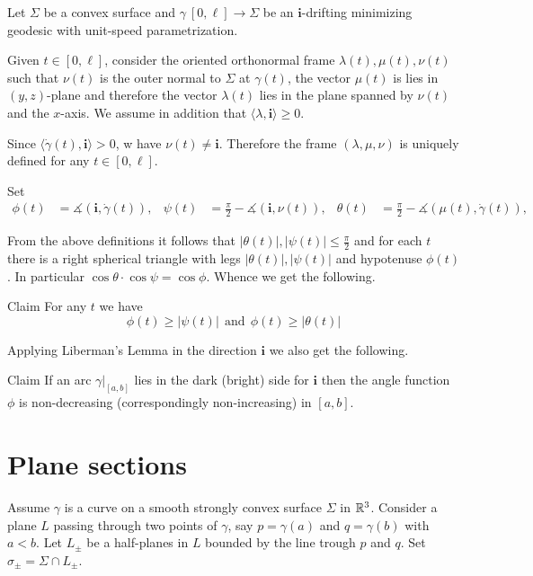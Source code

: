 \documentclass[a4paper,10pt]{article}
\begin{document}
Let $\Sigma$ be a convex surface 
and $\gamma\:[0,\ell]\to \Sigma$ be an $\bm{i}$-drifting minimizing geodesic 
with unit-speed para\-me\-tri\-za\-tion.

Given $t\in [0,\ell]$, 
consider the oriented orthonormal frame $\lambda(t),\mu(t),\nu(t)$ 
such that $\nu(t)$ is the outer normal to $\Sigma$ at $\gamma(t)$,
the vector $\mu(t)$ is lies in $(y,z)$-plane 
and therefore the vector $\lambda(t)$ lies in the plane spanned by $\nu(t)$ and the $x$-axis.
We assume in addition that $\langle\lambda,\bm{i}\rangle\ge 0$.

Since $\langle\dot\gamma(t),\bm{i}\rangle>0$, w have
$\nu(t)\ne\bm{i}$.
Therefore the frame $(\lambda,\mu,\nu)$ is uniquely defined for any $t\in[0,\ell]$.

Set 
\begin{align*}
\phi(t)&=\measuredangle(\bm{i},\dot\gamma(t)),&
\psi(t)&=\tfrac\pi2-\measuredangle(\bm{i},\nu(t)),&
\theta(t)&=\tfrac\pi2-\measuredangle(\mu(t),\dot\gamma(t)),
\end{align*}

From the above definitions it follows that $|\theta(t)|,|\psi(t)|\le \tfrac\pi2$ and for each $t$ there is a right spherical triangle with legs $|\theta(t)|,|\psi(t)|$ and hypotenuse $\phi(t)$.
In particular $\cos\theta\cdot\cos\psi=\cos\phi$.
Whence we get the following.

\begin{thm}{Claim}\label{clm:alpha-phi-psi}
For any $t$ we have 
\[
\phi(t)\ge |\psi(t)|\ \ \text{and}\ \ \phi(t)\ge |\theta(t)|
\]

\end{thm}

Applying Liberman's Lemma in the direction $\bm{i}$ we also get the following.

\begin{thm}{Claim}\label{clm:7.3}
If an arc $\gamma|_{[a,b]}$ lies in the dark (bright) side for $\bm{i}$ then 
the angle function $\phi$ is non-decreasing (correspondingly non-increasing)
in $[a,b]$.
\end{thm}

\section{Plane sections}

Assume $\gamma$ is a curve on a smooth strongly convex surface $\Sigma$ in $\mathbb{R}^3$.
Consider a plane $L$ 
passing through two points of $\gamma$, 
say $p=\gamma(a)$ and $q=\gamma(b)$ with $a<b$.
Let $L_\pm$ be a  half-planes in $L$ bounded by the line trough $p$ and $q$.
Set $\sigma_\pm=\Sigma\cap L_\pm$.
\end{document}
